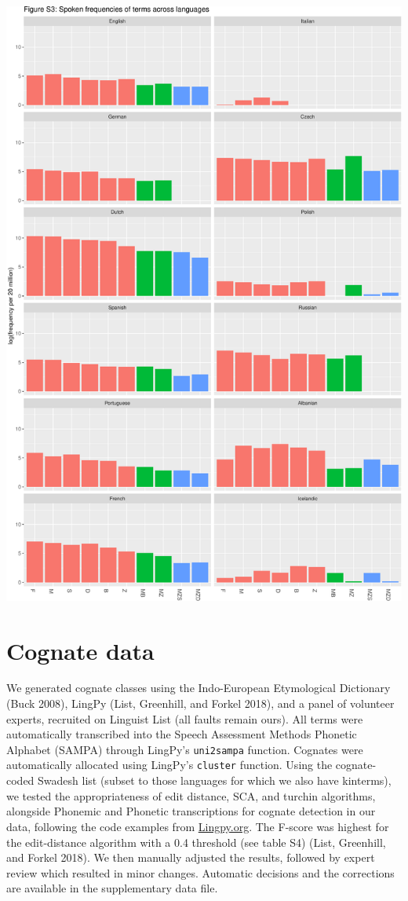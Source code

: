 \documentclass[]{article}
\begin{document}
\begin{center}\includegraphics{figures/unnamed-chunk-6-3} \end{center}

\section{Cognate data}\label{cognate-data}

We generated cognate classes using the Indo-European Etymological
Dictionary (Buck 2008), LingPy (List, Greenhill, and Forkel 2018), and a
panel of volunteer experts, recruited on Linguist List (all faults
remain ours). All terms were automatically transcribed into the Speech
Assessment Methods Phonetic Alphabet (SAMPA) through LingPy's
\texttt{uni2sampa} function. Cognates were automatically allocated using
LingPy's \texttt{cluster} function. Using the cognate-coded Swadesh list
(subset to those languages for which we also have kinterms), we tested
the appropriateness of edit distance, SCA, and turchin algorithms,
alongside Phonemic and Phonetic transcriptions for cognate detection in
our data, following the code examples from
\href{http://lingpy.org/examples.html}{Lingpy.org}. The F-score was
highest for the edit-distance algorithm with a 0.4 threshold (see table
S4) (List, Greenhill, and Forkel 2018). We then manually adjusted the
results, followed by expert review which resulted in minor changes.
Automatic decisions and the corrections are available in the
supplementary data file.
\end{document}

